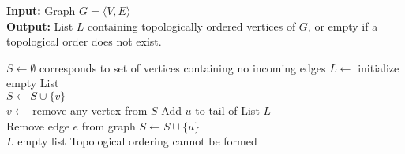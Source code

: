 \documentclass[12pt,a4paper]{article}
\begin{document}
	\begin{algorithm}
		\textbf{Input:} Graph $ G = \langle V, E \rangle $
		\\\textbf{Output:} List $ L $ containing topologically ordered vertices of $ G $, or empty if a topological order does not exist.
		\begin{algorithmic}
				\State $ S \gets \emptyset $ \Comment corresponds to set of vertices containing no incoming edges
				\State $ L \gets $ initialize empty List
				\\
						\State $ S \gets S \cup \{v\} $
					\EndIf
				\EndFor
				\\
					\State $ v \gets $ remove any vertex from $ S $
					\State Add $ u $ to tail of List $ L $
					\\
						\State Remove edge $ e $ from graph
							\State $ S \gets S \cup \{u\} $
						\EndIf
					\EndFor
				\EndWhile
				\\
					\State \Return $ L $
				\Else
					\State \Return empty list \Comment Topological ordering cannot be formed
				\EndIf
			\EndProcedure
		\end{algorithmic}
	\end{algorithm}
\end{document}
